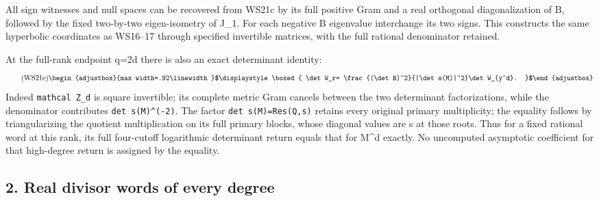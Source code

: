 \documentclass[11pt]{article}
\begin{document}
All sign witnesses and null spaces can be recovered from WS21c by its full positive Gram and a real orthogonal diagonalization of B, followed by the fixed two-by-two eigen-isometry of J\_1. For each negative B eigenvalue interchange its two signs. This constructs the same hyperbolic coordinates as WS16--17 through specified invertible matrices, with the full rational denominator retained.

At the full-rank endpoint q=2d there is also an exact determinant identity: 
\begin{equation*}
\tag{WS21e}
\begin{adjustbox}{max width=.92\linewidth}$\displaystyle \boxed{
 \det W_r=
 \frac{(\det B)^2}{|\det s(M)|^2}\det W_{y^d}.
 }$\end{adjustbox}
\end{equation*}
 Indeed \texttt{mathcal Z\_\allowbreak{}d} is square invertible; its complete metric Gram cancels between the two determinant factorizations, while the denominator contributes \texttt{\textbar{}det s(M)\textbar{}\^{}(-2)}. The factor \texttt{det s(M)=\allowbreak{}Res(Q,\allowbreak{}s)} retains every original primary multiplicity; the equality follows by triangularizing the quotient multiplication on its full primary blocks, whose diagonal values are s at those roots. Thus for a fixed rational word at this rank, its full four-cutoff logarithmic determinant return equals that for M\^{}d exactly. No uncomputed asymptotic coefficient for that high-degree return is assigned by the equality.

\subsection{2. Real divisor words of every degree}\label{part3-real-divisor-words-of-every-degree}
\end{document}

